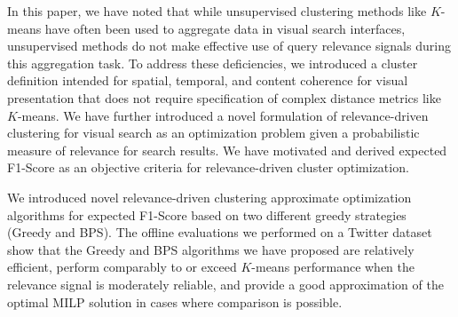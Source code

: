 



In this paper, we have noted that while unsupervised clustering methods like $K$-means have often been used to aggregate data in visual search interfaces, unsupervised methods do not make effective use of query relevance signals during this aggregation task.  To address these deficiencies, we introduced a cluster definition intended for spatial, temporal, and content coherence for visual presentation that does not require specification of complex distance metrics like $K$-means.  We have further introduced a novel formulation of relevance-driven clustering for visual search as an optimization problem given a probabilistic measure of relevance for search results.  We have motivated and derived expected F1-Score as an objective criteria for relevance-driven cluster optimization.%

We introduced novel relevance-driven clustering approximate optimization algorithms for expected F1-Score based on two different greedy strategies (Greedy and BPS).  %
The offline evaluations we performed on a Twitter dataset show that the Greedy and BPS algorithms we have proposed are relatively efficient, perform comparably to or exceed $K$-means performance when the relevance signal is moderately reliable, and provide a good approximation of the optimal MILP solution in cases where comparison is possible.

